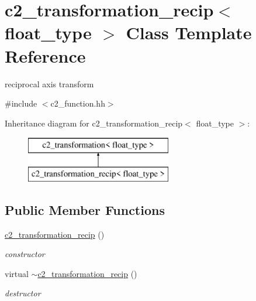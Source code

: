 \hypertarget{classc2__transformation__recip}{\section{c2\-\_\-transformation\-\_\-recip$<$ float\-\_\-type $>$ Class Template Reference}
\label{classc2__transformation__recip}
}


reciprocal axis transform  




{\ttfamily \#include $<$c2\-\_\-function.\-hh$>$}

Inheritance diagram for c2\-\_\-transformation\-\_\-recip$<$ float\-\_\-type $>$\-:\begin{figure}[H]
\begin{center}
\leavevmode
\includegraphics[height=2.000000cm]{classc2__transformation__recip}
\end{center}
\end{figure}
\subsection*{Public Member Functions}
\begin{DoxyCompactItemize}
\item 
\hypertarget{classc2__transformation__recip_ae02a2e64cf927343332eec0b5c9e2235}{\hyperlink{classc2__transformation__recip_ae02a2e64cf927343332eec0b5c9e2235}{c2\-\_\-transformation\-\_\-recip} ()}\label{classc2__transformation__recip_ae02a2e64cf927343332eec0b5c9e2235}

\begin{DoxyCompactList}\small\item\em constructor \end{DoxyCompactList}\item 
\hypertarget{classc2__transformation__recip_ac154bb15973de9c28497726a3ca2a175}{virtual \hyperlink{classc2__transformation__recip_ac154bb15973de9c28497726a3ca2a175}{$\sim$c2\-\_\-transformation\-\_\-recip} ()}\label{classc2__transformation__recip_ac154bb15973de9c28497726a3ca2a175}

\begin{DoxyCompactList}\small\item\em destructor \end{DoxyCompactList}\end{DoxyCompactItemize}
